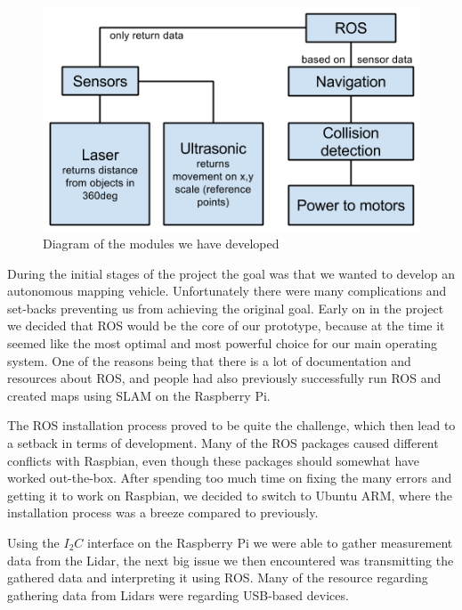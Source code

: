 \begin{figure}[H]
	\centering
	\includegraphics[scale=.5]{images/developmentdiagram2.png}
	\caption{Diagram of the modules we have developed}
	\label{fig:developmentdiagram2}
\end{figure}

During the initial stages of the project the goal was that we wanted to develop an autonomous mapping vehicle. Unfortunately there were many complications and set-backs preventing us from achieving the original goal. 
Early on in the project we decided that ROS would be the core of our prototype, because at the time it seemed like the most optimal and most powerful choice for our main operating system. One of the reasons being that there is a lot of documentation and resources about ROS, and people had also previously successfully run ROS and created maps using SLAM on the Raspberry Pi.\cite{pibot}\cite{pibotbook}

The ROS installation process proved to be quite the challenge, which then lead to a setback in terms of development. Many of the ROS packages caused different conflicts with Raspbian, even though these packages should somewhat have worked out-the-box. After spending too much time on fixing the many errors and getting it to work on Raspbian, we decided to switch to Ubuntu ARM, where the installation process was a breeze compared to previously.

Using the $I_2C$ interface on the Raspberry Pi we were able to gather measurement data from the Lidar, the next big issue we then encountered was transmitting the gathered data and interpreting it using ROS. Many of the resource regarding gathering data from Lidars were regarding USB-based devices. %


